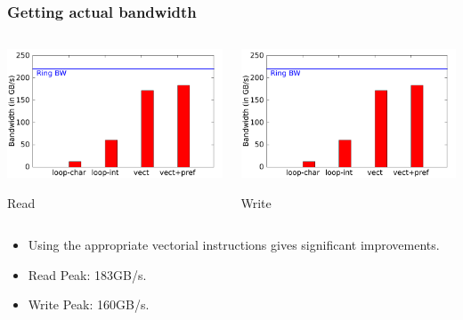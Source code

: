 \documentclass{beamer}
\begin{document}
\begin{frame}
  \frametitle{Getting actual bandwidth}
  
  \begin{columns}

    \begin{center}
      \includegraphics[width=\linewidth,page=1]{slides-figures/PPAM-data/bandwidth.pdf}
      
      Read
    \end{center}


    \begin{center}
      \includegraphics[width=\linewidth,page=2]{slides-figures/PPAM-data/bandwidth.pdf}
      
      Write
    \end{center}

  \end{columns}
  

  \begin{itemize}
  \item Using the appropriate vectorial instructions gives significant
    improvements.
  \item Read Peak: 183GB/s.
  \item Write Peak: 160GB/s.
  \end{itemize}

\end{frame}
\end{document}
